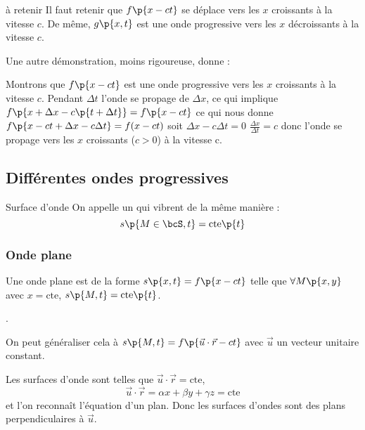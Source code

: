     \begin{form}{à retenir}{}
        Il faut retenir que $f\p{x - ct}$ se déplace vers les $x$ croissants à la vitesse $c$.
    De même, $g\p{x, t}$ est une onde progressive vers les $x$ décroissants à la vitesse $c$.
    \end{form}
    
    Une autre démonstration, moins rigoureuse, donne :
    \begin{nproof}
        Montrons que $f\p{x - ct}$ est une onde progressive vers les $x$ croissants à la vitesse $c$. Pendant $\Delta t$ l'onde se propage de $\Delta x$, ce qui implique $f\p{x + \Delta x - c \p{t + \Delta t}} = f\p{x - ct}$ ce qui nous donne $f\p{x - ct + \Delta x - c \Delta t} = f(x - ct)$ soit $\Delta x - c \Delta t = 0$
        $\frac{\Delta x}{\Delta t} = c$ donc l'onde se propage vers les $x$ croissants ($c > 0$) à la vitesse c.
    \end{nproof}

    \subsection{Différentes ondes progressives}

    \begin{definition}{Surface d'onde}{}
        On appelle  un  qui vibrent de la même manière :
        \[ s\p{M \in \bcS, t} = \text{cte}\p{t}\]
    \end{definition}
    
    \subsubsection{Onde plane}
    \begin{example}{}{}
        Une onde plane est de la forme $s\p{x, t} = f\p{x - ct}$ telle que $\forall M\p{x, y}$ avec $x = \text{cte}$, $s\p{M, t} = \text{cte}\p{t}$.
      
        \begin{enumerate}
            \itt {}.
        \end{enumerate}
        
        On peut généraliser cela à $s\p{M, t} = f\p{\vec{u} \cdot \vec{r} - ct}$ avec $\vec{u}$ un vecteur unitaire constant.
    
        Les surfaces d'onde sont telles que $\vec u \cdot \vec r = \text{cte}$, \ie
        \[ \vec u \cdot \vec r = \alpha x + \beta y + \gamma z = \text{cte} \]
        et l'on reconnaît l'équation d'un plan. Donc les surfaces d'ondes sont des plans perpendiculaires à $\vec{u}$.
    \end{example}
    
